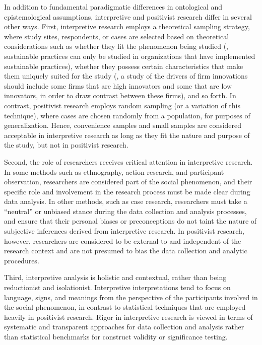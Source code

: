 In addition to fundamental paradigmatic differences in ontological and epistemological assumptions, interpretive and positivist research differ in several other ways. First, interpretive research employs a theoretical sampling strategy, where study sites, respondents, or cases are selected based on theoretical considerations such as whether they fit the phenomenon being studied (\eg, sustainable practices can only be studied in organizations that have implemented sustainable practices), whether they possess certain characteristics that make them uniquely suited for the study (\eg, a study of the drivers of firm innovations should include some firms that are high innovators and some that are low innovators, in order to draw contrast between these firms), and so forth. In contrast, positivist research employs random sampling (or a variation of this technique), where cases are chosen randomly from a population, for purposes of generalization. Hence, convenience samples and small samples are considered acceptable in interpretive research as long as they fit the nature and purpose of the study, but not in positivist research.

Second, the role of researchers receives critical attention in interpretive research. In some methods such as ethnography, action research, and participant observation, researchers are considered part of the social phenomenon, and their specific role and involvement in the research process must be made clear during data analysis. In other methods, such as case research, researchers must take a ``neutral'' or unbiased stance during the data collection and analysis processes, and ensure that their personal biases or preconceptions do not taint the nature of subjective inferences derived from interpretive research. In positivist research, however, researchers are considered to be external to and independent of the research context and are not presumed to bias the data collection and analytic procedures.

Third, interpretive analysis is holistic and contextual, rather than being reductionist and isolationist. Interpretive interpretations tend to focus on language, signs, and meanings from the perspective of the participants involved in the social phenomenon, in contrast to statistical techniques that are employed heavily in positivist research. Rigor in interpretive research is viewed in terms of systematic and transparent approaches for data collection and analysis rather than statistical benchmarks for construct validity or significance testing.

